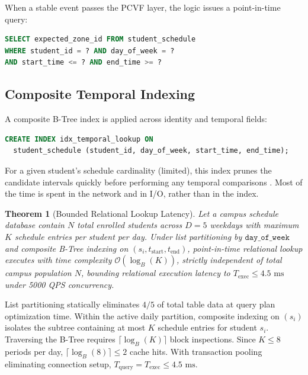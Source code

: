 \documentclass[conference]{IEEEtran}
\newtheorem{theorem}{Theorem}
\begin{document}
When a stable event passes the PCVF layer, the logic issues a point-in-time query:
\begin{lstlisting}[language=SQL]
SELECT expected_zone_id FROM student_schedule 
WHERE student_id = ? AND day_of_week = ? 
AND start_time <= ? AND end_time >= ?
\end{lstlisting}

\subsection{Composite Temporal Indexing}
A composite B-Tree index \cite{b18} is applied across identity and temporal fields:
\begin{lstlisting}[language=SQL]
CREATE INDEX idx_temporal_lookup ON 
  student_schedule (student_id, day_of_week, start_time, end_time);
\end{lstlisting}
For a given student's schedule cardinality (limited), this index prunes the candidate intervals quickly before performing any temporal comparisons \cite{b19}. Most of the time is spent in the network and in I/O, rather than in the index.

\begin{theorem}[Bounded Relational Lookup Latency]
Let a campus schedule database contain $N$ total enrolled students across $D=5$ weekdays with maximum $K$ schedule entries per student per day. Under list partitioning by $\mathtt{day\_of\_week}$ and composite B-Tree indexing on $(s_i, t_{\mathrm{start}}, t_{\mathrm{end}})$, point-in-time relational lookup executes with time complexity $\mathcal{O}(\log_B(K))$, strictly independent of total campus population $N$, bounding relational execution latency to $T_{\mathrm{exec}} \le 4.5\text{ ms}$ under 5000 QPS concurrency.
\end{theorem}

\begin{IEEEproof}
List partitioning statically eliminates $4/5$ of total table data at query plan optimization time. Within the active daily partition, composite indexing on $(s_i)$ isolates the subtree containing at most $K$ schedule entries for student $s_i$. Traversing the B-Tree requires $\lceil \log_B(K) \rceil$ block inspections. Since $K \le 8$ periods per day, $\lceil \log_B(8) \rceil \le 2$ cache hits. With transaction pooling eliminating connection setup, $T_{\mathrm{query}} = T_{\mathrm{exec}} \le 4.5\text{ ms}$.
\end{IEEEproof}

\end{document}
